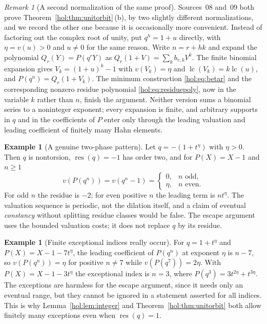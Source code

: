 \documentclass[11pt]{article}
\numberwithin{equation}{section}
\theoremstyle{definition}
\newtheorem{example}[theorem]{Example}
\theoremstyle{remark}
\newtheorem{remark}[theorem]{Remark}
\newcommand{\lc}{\operatorname{lc}}
\newcommand{\res}{\operatorname{res}}
\begin{document}
\begin{remark}[A second normalization of the same proof]
\label{hol:rem:unitalt}
Sources~08 and~09 both prove Theorem~\ref{hol:thm:unitorbit}\,(b), by two
slightly different normalizations, and we record the other one because it is
occasionally more convenient. Instead of factoring out the complex root of
unity, put $q^h=1+u$ directly, with $\eta=v(u)>0$ and $u\ne0$ for the same
reason. Write $n=r+hk$ and expand the polynomial $Q_r(Y)=P(q^rY)$ as
$Q_r(1+V)=\sum_kb_{r,k}V^k$. The finite binomial expansion gives
$V_k=(1+u)^k-1$ with $v(V_k)=\eta$ and $\lc(V_k)=k\lc(u)$, and
$P(q^n)=Q_r(1+V_k)$. The minimum construction \eqref{hol:eq:betar} and the corresponding
nonzero residue polynomial \eqref{hol:eq:residuepoly}, now in the variable
$k$ rather than $n$, finish the argument. Neither version sums a binomial
series to a noninteger exponent; every expansion is finite, and arbitrary
supports in $q$ and in the coefficients of $P$ enter only through the leading
valuation and leading coefficient of finitely many Hahn elements.
\end{remark}

\begin{example}[A genuine two-phase pattern]\label{hol:ex:unitperiod}
Let $q=-(1+t^\eta)$ with $\eta>0$. Then $q$ is nontorsion, $\res(q)=-1$ has
order two, and for $P(X)=X-1$ and $n\ge1$
\[
 v(P(q^n))=v(q^n-1)=
 \begin{cases}
 0,&n\text{ odd},\\
 \eta,&n\text{ even}.
 \end{cases}
\]
For odd $n$ the residue is $-2$; for even positive $n$ the leading term is
$nt^\eta$. The valuation sequence is periodic, not the dilation itself, and a
claim of eventual \emph{constancy} without splitting residue classes would be
false. The escape argument uses the bounded valuation costs; it does not
replace $q$ by its residue.
\end{example}

\begin{example}[Finite exceptional indices really occur]
\label{hol:ex:unitexception}
For $q=1+t^\eta$ and $P(X)=X-1-7t^\eta$, the leading coefficient of $P(q^n)$
at exponent $\eta$ is $n-7$, so $v(P(q^n))=\eta$ for positive $n\ne7$ while
$v(P(q^7))=2\eta$. With $P(X)=X-1-3t^\eta$ the exceptional index is $n=3$,
where $P(q^3)=3t^{2\eta}+t^{3\eta}$. The exceptions are harmless for the
escape argument, since it needs only an eventual range, but they cannot be
ignored in a statement asserted for all indices. This is why
Lemma~\ref{hol:lem:integer} and Theorem~\ref{hol:thm:unitorbit} both allow
finitely many exceptions even when $\res(q)=1$.
\end{example}
\end{document}
